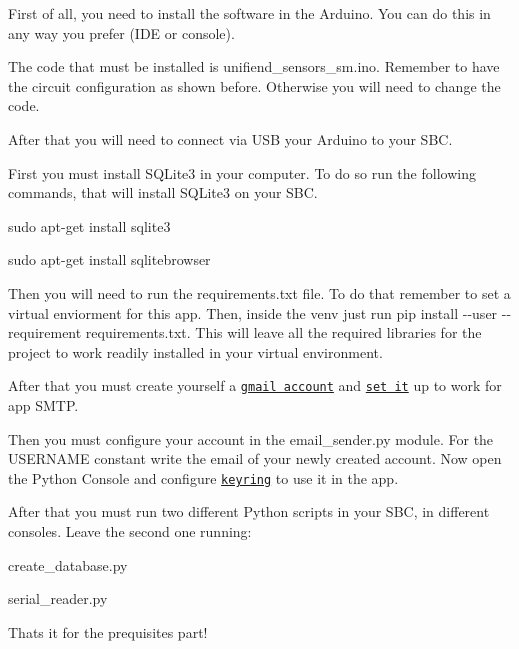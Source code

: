 First of all, you need to install the software in the Arduino. You can do this in any way you prefer (I\+DE or console).

The code that must be installed is {\ttfamily unifiend\+\_\+sensors\+\_\+sm.\+ino}. Remember to have the circuit configuration as shown before. Otherwise you will need to change the code.

After that you will need to connect via U\+SB your Arduino to your S\+BC.
\begin{DoxyItemize}
\item First you must install S\+Q\+Lite3 in your computer. To do so run the following commands, that will install S\+Q\+Lite3 on your S\+BC.
\begin{DoxyItemize}
\item {\ttfamily sudo apt-\/get install sqlite3}
\item {\ttfamily sudo apt-\/get install sqlitebrowser}
\end{DoxyItemize}
\item Then you will need to run the requirements.\+txt file. To do that remember to set a virtual enviorment for this app. Then, inside the venv just run {\ttfamily pip install -\/-\/user -\/-\/requirement requirements.\+txt}. This will leave all the required libraries for the project to work readily installed in your virtual environment.
\item After that you must create yourself a \href{https://accounts.google.com/signup/v2/webcreateaccount?flowName=GlifWebSignIn&flowEntry=SignUp}{\tt gmail account} and \href{https://myaccount.google.com/lesssecureapps}{\tt set it} up to work for app S\+M\+TP.
\begin{DoxyItemize}
\item Then you must configure your account in the {\ttfamily email\+\_\+sender.\+py} module. For the {\ttfamily U\+S\+E\+R\+N\+A\+ME} constant write the email of your newly created account. Now open the Python Console and configure \href{https://pypi.org/project/keyring/}{\tt keyring} to use it in the app.
\end{DoxyItemize}
\item After that you must run two different Python scripts in your S\+BC, in different consoles. Leave the second one running\+:
\begin{DoxyItemize}
\item {\ttfamily create\+\_\+database.\+py}
\item {\ttfamily serial\+\_\+reader.\+py}
\end{DoxyItemize}

That\textquotesingle{}s it for the prequisites part!
\end{DoxyItemize}

